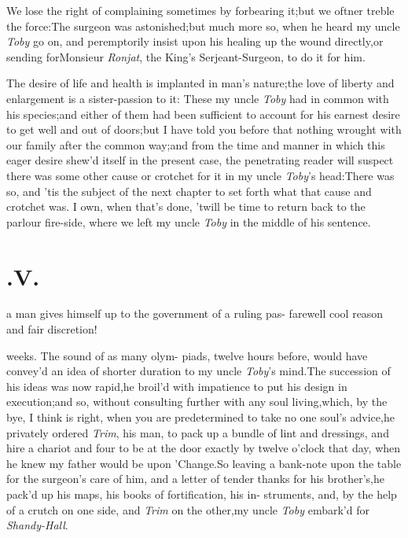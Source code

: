 \documentclass{article}
\begin{document}
\tsk We lose the right of complaining sometimes by forbearing
it;\tsk but we oftner treble the force:\tsk The surgeon was
astonished;\tsk but much more so, when he heard my uncle \textit{Toby} go on,
and peremptorily insist upon his healing up the wound
directly,\tsh or sending for\break Monsieur \textit{Ronjat}, the
King’s Serjeant-\break Surgeon, to do it for him.

The desire of life and health is implanted in man’s
nature;\tsh the love of liberty and enlargement is a
sister-passion to it: These my uncle \textit{Toby} had in common with
his species;\tsk and either of them had been sufficient to account for his earnest
desire to get well and out of doors;\tsk but I have told
you before that nothing wrought with our family after the common
way;\tsh and from the time and manner in which this eager
desire shew’d itself in the present case, the penetrating reader
will suspect there was some other cause or crotchet for it in my
uncle \textit{Toby}’s head:\tsk There was so, and
’tis the subject of the next chapter to set forth what that
cause and crotchet was. I own, when that’s done, ’twill
be time to return back to the parlour fire-side, where we left my
uncle \textit{Toby} in the middle of his sentence.


\null
\section{.\enspace  V.}

 a man gives himself up to\break 
the government of a ruling pas-\break
{}
farewell cool reason and fair discretion!

\noindent
{}
weeks. The sound of as many olym-\break
piads, twelve hours before, would have
convey’d an idea of shorter duration to my uncle
\textit{Toby}’s mind.\tsh The succession of his ideas
was now rapid,\tsk he broil’d with impatience to put his design
in execution;\tsk and so, without consulting further with
any soul living,\tsk which, by the bye, I think is right, when
you are predetermined to take no one soul’s
advice,\tsk he privately ordered \textit{Trim}, his man, to
pack up a bundle of lint and dressings, and hire a chariot and four
to be at the door exactly by twelve o’clock that day, when he
knew my father would be upon ’Change.\tsk So leaving
a bank-note upon the table for the surgeon’s care of him, and
a letter of tender thanks\break 
for his brother’s,\tsk he pack’d up his\break
maps, his books of fortification, his in-\break
struments, \etc\tsk and, by the help of a
crutch on one side, and \textit{Trim} on the\break
other,\tsh my uncle \textit{Toby} embark’d for\break
\textit{Shandy-Hall}.
\end{document}

